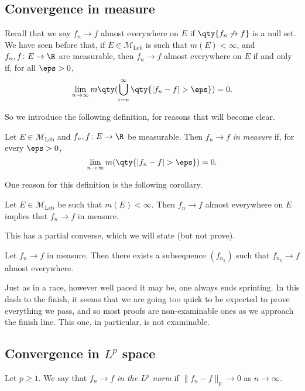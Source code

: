 \documentclass{maths}
\newcommand{\mleb}{\mathcal{M}_{\text{Leb}}}
\begin{document}
\subsection{Convergence in measure}

Recall that we say $f_n\to f$ almost everywhere on $E$ if $\qty{f_n\not\to f}$ is a null set.
We have seen before that, if $E\in\mleb$ is such that $m(E)<\infty$, and $f_n,f\colon E\to\R$ are measurable, then $f_n\to f$ almost everywhere on $E$ if and only if, for all $\eps>0$,
\[
    \lim_{n\to\infty} m\qty(\bigcup_{i=n}^{\infty}\qty{|f_n-f|>\eps}) =
    0.
\]

So we introduce the following definition, for reasons that will become clear.

\begin{defn}
    Let $E\in\mleb$ and $f_n,f\colon E\to\R$ be measurable.
    Then $f_n\to f$ \emph{in measure} if, for every $\eps>0$,
    \[
        \lim_{n\to\infty} m(\qty{|f_n-f|>\eps}) =
        0.
    \]
\end{defn}

One reason for this definition is the following corollary.

\begin{cor}
    Let $E\in\mleb$ be such that $m(E)<\infty$.
    Then $f_n\to f$ almost everywhere on $E$ implies that $f_n\to f$ in measure.
\end{cor}

This has a partial converse, which we will state (but not prove).

\begin{prop}
    Let $f_n\to f$ in measure.
    Then there exists a subsequence $(f_{n_k})$ such that $f_{n_k}\to f$ almost everywhere.
\end{prop}

\begin{prf}
    Just as in a race, however well paced it may be, one always ends sprinting.
    In this dash to the finish, it seems that we are going too quick to be expected to prove everything we pass, and so most proofs are non-examinable ones as we approach the finish line.
    This one, in particular, is not examinable.
\end{prf}

\subsection{Convergence in \texorpdfstring{$L^p$}{Lp} space}

\begin{defn}[Convergence in $L^p$]
    Let $p\geqslant1$.
    We say that $f_n\to f$ \emph{in the $L^p$ norm} if $\|f_n-f\|_p\to0$ as $n\to\infty$.
\end{defn}
\end{document}
